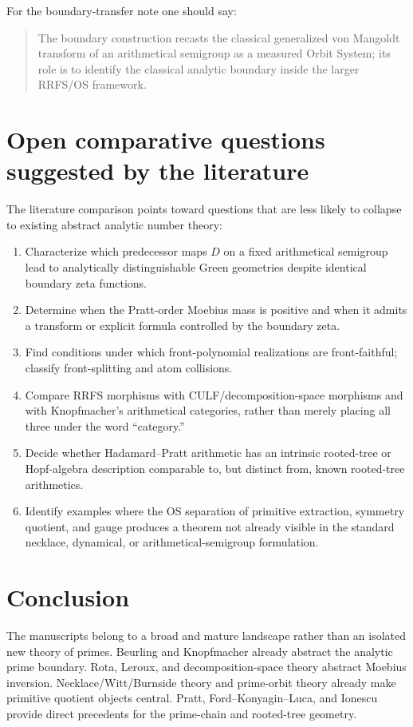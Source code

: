 \documentclass[11pt]{article}
\begin{document}
For the boundary-transfer note one should say:
\begin{quote}
The boundary construction recasts the classical generalized von Mangoldt transform of an arithmetical semigroup as a measured Orbit System; its role is to identify the classical analytic boundary inside the larger RRFS/OS framework.
\end{quote}

\section{Open comparative questions suggested by the literature}
The literature comparison points toward questions that are less likely to collapse to existing abstract analytic number theory:
\begin{enumerate}[label=(\arabic*)]
\item Characterize which predecessor maps $D$ on a fixed arithmetical semigroup lead to analytically distinguishable Green geometries despite identical boundary zeta functions.
\item Determine when the Pratt-order Moebius mass is positive and when it admits a transform or explicit formula controlled by the boundary zeta.
\item Find conditions under which front-polynomial realizations are front-faithful; classify front-splitting and atom collisions.
\item Compare RRFS morphisms with CULF/decomposition-space morphisms and with Knopfmacher's arithmetical categories, rather than merely placing all three under the word ``category.''
\item Decide whether Hadamard--Pratt arithmetic has an intrinsic rooted-tree or Hopf-algebra description comparable to, but distinct from, known rooted-tree arithmetics.
\item Identify examples where the OS separation of primitive extraction, symmetry quotient, and gauge produces a theorem not already visible in the standard necklace, dynamical, or arithmetical-semigroup formulation.
\end{enumerate}

\section{Conclusion}
The manuscripts belong to a broad and mature landscape rather than an isolated new theory of primes. Beurling and Knopfmacher already abstract the analytic prime boundary. Rota, Leroux, and decomposition-space theory abstract Moebius inversion. Necklace/Witt/Burnside theory and prime-orbit theory already make primitive quotient objects central. Pratt, Ford--Konyagin--Luca, and Ionescu provide direct precedents for the prime-chain and rooted-tree geometry.
\end{document}
